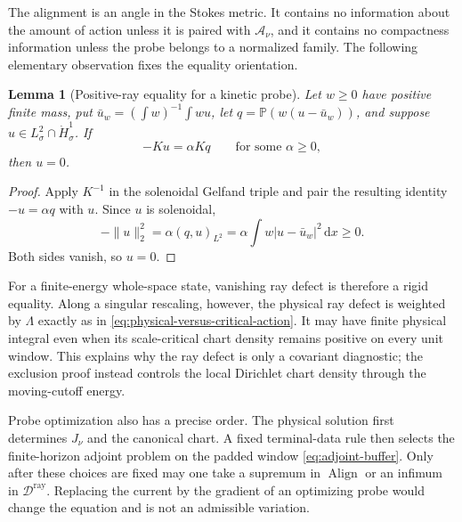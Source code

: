 \documentclass[11pt]{amsart}
\numberwithin{equation}{section}
\theoremstyle{plain}
\newtheorem{lemma}[lemma]{Lemma}
\theoremstyle{definition}
\theoremstyle{remark}
\newcommand{\dd}{\,\mathrm d}
\newcommand{\Pdiv}{\mathbb P}
\newcommand{\Action}{\mathcal A}
\newcommand{\Align}{\operatorname{Align}}
\newcommand{\RayDefect}{\mathscr D^{\mathrm{ray}}}
\begin{document}
The alignment is an angle in the Stokes metric.  It contains no information
about the amount of action unless it is paired with \(\Action_\nu\), and it
contains no compactness information unless the probe belongs to a normalized
family.  The following elementary observation fixes the equality orientation.

\begin{lemma}[Positive-ray equality for a kinetic probe]
\label{lem:positive-ray-equality}
Let \(w\ge0\) have positive finite mass, put
\(\bar u_w=(\int w)^{-1}\int wu\), let
\(q=\Pdiv(w(u-\bar u_w))\), and suppose
\(u\in L^2_\sigma\cap\dot H^1_\sigma\).  If
\begin{equation}\label{eq:positive-ray-equality}
 -Ku=\alpha Kq
 \qquad\text{for some }\alpha\ge0,
\end{equation}
then \(u=0\).
\end{lemma}

\begin{proof}
Apply \(K^{-1}\) in the solenoidal Gelfand triple and pair the resulting
identity \(-u=\alpha q\) with \(u\).  Since \(u\) is solenoidal,
\[
 -\|u\|_2^2
 =\alpha(q,u)_{L^2}
 =\alpha\int w|u-\bar u_w|^2\dd x\ge0.
\]
Both sides vanish, so \(u=0\).
\end{proof}

For a finite-energy whole-space state, vanishing ray defect is therefore a
rigid equality.  Along a singular rescaling, however, the physical ray defect
is weighted by \(\Lambda\) exactly as in
\eqref{eq:physical-versus-critical-action}.  It may have finite physical
integral even when its scale-critical chart density remains positive on every
unit window.  This explains why the ray defect is only a covariant diagnostic;
the exclusion proof instead controls the local Dirichlet chart density through
the moving-cutoff energy.

Probe optimization also has a precise order.  The physical solution first
determines \(J_\nu\) and the canonical chart.  A fixed terminal-data rule then
selects the finite-horizon adjoint problem on the padded window
\eqref{eq:adjoint-buffer}.  Only after these choices are fixed may one take a
supremum in \(\Align\) or an infimum in \(\RayDefect\).  Replacing the current
by the gradient of an optimizing probe would change the equation and is not
an admissible variation.
\end{document}
